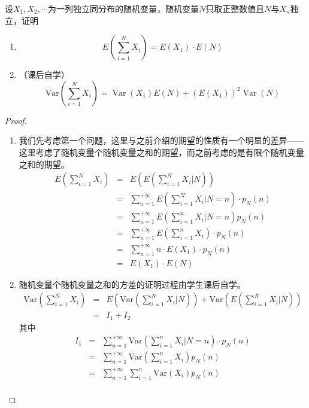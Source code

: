 \begin{example}
    设$X_{1},X_{2},\cdots$为一列独立同分布的随机变量，随机变量$N$只取正整数值且$N$与${X_{n}}$独立，证明
    \begin{enumerate}
        \item $$
        E\left(\sum_{i=1}^{N} X_{i}\right)=E\left(X_{1}\right) \cdot E(N)
        $$
        \item （课后自学）$$
        \text{Var}\left(\sum_{i=1}^{N} X_{i}\right)=\operatorname{Var}\left(X_{1}\right) E(N)+\left(E\left(X_{1}\right)\right)^{2} \operatorname{Var}(N)
        $$
    \end{enumerate}
\end{example}
\begin{proof}
    \begin{enumerate}
        \item 我们先考虑第一个问题，这里与之前介绍的期望的性质有一个明显的差异——这里考虑了随机变量个随机变量之和的期望，而之前考虑的是有限个随机变量之和的期望。
        \begin{eqnarray*}
           E\left(\sum_{i=1}^{N} X_{i}\right) &=&E\left(E\left(\sum_{i=1}^{N} X_{i}  |  N\right)\right) \\
&=&\sum_{n=1}^{+\infty} E\left(\sum_{i=1}^{N} X_{i}  |  N=n\right) \cdot p_{N}(n) \\
&=&\sum_{n=1}^{+\infty} E\left(\sum_{i=1}^{n} X_{i}  |  N=n\right) p_{N}(n) \\
&=&\sum_{n=1}^{+\infty} E\left(\sum_{i=1}^{n} X_{i}\right) \cdot p_{N}(n) \\
&=&\sum_{n=1}^{+\infty} n \cdot E\left(X_{1}\right) \cdot p_{N}(n) \\
&=&E\left(X_{1}\right) \cdot E(N) 
        \end{eqnarray*}
\item 随机变量个随机变量之和的方差的证明过程由学生课后自学。
\begin{eqnarray*}
    \text{Var}\left(\sum_{i=1}^{N} X_{i}\right) &=&
    E\left(\text{Var}\left(\sum_{i=1}^{N} X_{i}  |  N\right)\right)+\text{Var}\left(E\left(\sum_{i=1}^{N} X_{i}  |  N\right)\right) \\
& =& I_{1}+I_{2}
\end{eqnarray*}
其中\begin{eqnarray*}
I_{1} &=&\sum_{n=1}^{+\infty} \text{Var}\left(\sum_{i=1}^{n} X_{i}  |  N=n\right) \cdot p_{N}(n) \\
&=&\sum_{n=1}^{+\infty} \text{Var}\left(\sum_{i=1}^{n} X_{i}\right) p_{N}(n) \\
&=&\sum_{n=1}^{+\infty} \sum_{i=1}^{n} \text{Var}\left(X_{i}\right) p_{N}(n) \\

\end{eqnarray*}
\end{enumerate}
\end{proof}
